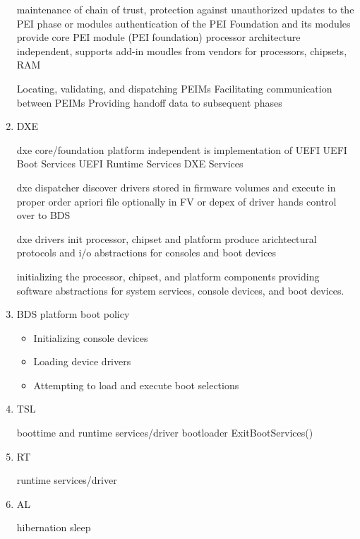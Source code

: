 \begin{enumerate}
    maintenance of chain of trust, protection against unauthorized updates to the PEI phase or modules
    authentication of the PEI Foundation and its modules
    provide core PEI module (PEI foundation) processor architecture independent, supports add-in moudles from vendors for processors, chipsets, RAM

    Locating, validating, and dispatching PEIMs
    Facilitating communication between PEIMs
    Providing handoff data to subsequent phases

    \item{\acf{DXE}}

    dxe core/foundation
    platform independent
    is implementation of UEFI
    UEFI Boot Services
    UEFI Runtime Services
    DXE Services

    dxe dispatcher
    discover drivers stored in firmware volumes and execute in proper order
    apriori file optionally in FV or depex of driver
    hands control over to BDS

    dxe drivers
    init processor, chipset and platform
    produce arichtectural protocols and i/o abstractions for consoles and boot devices

    initializing the processor, chipset, and platform components
    providing software abstractions for system services, console devices, and boot devices.

    \item{\acf{BDS}}
    platform boot policy


    \begin{itemize}
        \item Initializing console devices
        \item Loading device drivers
        \item Attempting to load and execute boot selections
    \end{itemize}

    \item{\acf{TSL}}

    boottime and runtime services/driver
    bootloader
    ExitBootServices()

    \item{\acf{RT}}

    runtime services/driver

    \item{\acf{AL}}

    hibernation
    sleep

\end{enumerate}

